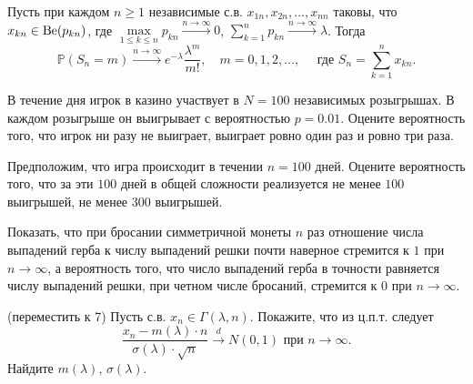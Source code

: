 \begin{problem}
Пусть при каждом $n\geqslant 1$ независимые с.в. $x_{1n}, x_{2n},\ldots, x_{nn}$ таковы, что $x_{kn}\in \mathrm{Be}(p_{kn})$, где 
$\max\limits_{1\leqslant k\leqslant n} p_{kn}\xrightarrow{n\to\infty}0$, $\sum\limits_{k=1}^{n}p_{kn}\xrightarrow{n\to\infty}\lambda$. 
Тогда 
\begin{equation}
\label{TPois}
{\mathbb P}(S_n=m)\xrightarrow{n\to\infty} e^{-\lambda}\frac{\lambda^m}{m!}, \quad m=0,1,2,\ldots, \quad 
\text{ где } S_n=\sum\limits_{k=1}^{n} x_{kn} . 
\end{equation}
\end{problem}

\begin{problem}
В течение дня игрок в казино участвует в $N=100$ независимых розыгрышах. В каждом розыгрыше он выигрывает с вероятностью 
$p=0.01$. Оцените вероятность того, что игрок ни разу не выиграет, выиграет ровно 
один раз и ровно три раза.

Предположим, что игра происходит в течении $n=100$ дней. 
Оцените вероятность того, что за эти $100$ дней в общей сложности реализуется не менее $100$ выигрышей, не менее $300$ выигрышей. 


\end{problem}



\begin{problem}

Показать, что при бросании симметричной монеты $n$ раз отношение числа выпадений герба к числу выпадений решки почти наверное стремится 
к $1$ при $n\to\infty$, а вероятность того, что число выпадений герба в точности равняется числу выпадений решки, при четном числе 
бросаний, стремится к $0$ при $n\to\infty$. 
\end{problem}



\begin{problem} (переместить к 7)
Пусть с.в. $x_n\in \Gamma(\lambda,n)$. Покажите, что из ц.п.т. следует 
$$
\frac{x_n-m(\lambda)\cdot n}{\sigma(\lambda)\cdot\sqrt{n}} \xrightarrow{d} N(0,1) \text{ при } n\to\infty . 
$$
Найдите $m(\lambda)$, $\sigma(\lambda)$. 
\end{problem}



